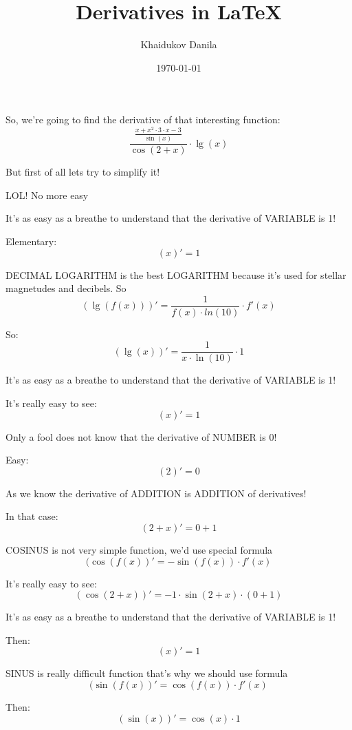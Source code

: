 \documentclass[a4paper,12pt]{article}
\author{Khaidukov Danila}
\title{Derivatives in \LaTeX{}}
\date{\today}
\begin{document}
\maketitle
\newpage

So, we're going to find the derivative of that interesting function:
\[ \frac{ \frac{ x + x ^ { 2 } \cdot 3 \cdot x - 3 }{ \sin\left( x\right)  } }{ \cos\left( 2 + x\right)  } \cdot \lg\left( x\right)  \]

But first of all lets try to simplify it!

LOL! No more easy

It's as easy as a breathe to understand that the derivative of VARIABLE is 1!

Elementary:
\[ \left(x\right)' = 1 \]

DECIMAL LOGARITHM is the best LOGARITHM because it's used for stellar magnetudes and decibels. So                                \[(\lg(f(x)))' = \frac{1}{f(x) \cdot ln(10)} \cdot f'(x) \]

So:
\[ \left(\lg\left( x\right) \right)' = \frac{ 1 }{ x \cdot \ln\left( 10\right)  } \cdot 1 \]

It's as easy as a breathe to understand that the derivative of VARIABLE is 1!

It's really easy to see:
\[ \left(x\right)' = 1 \]

Only a fool does not know that the derivative of NUMBER is 0!

Easy:
\[ \left(2\right)' = 0 \]

As we know the derivative of ADDITION is ADDITION of derivatives!

In that case:
\[ \left(2 + x\right)' = 0 + 1 \]

COSINUS is not very simple function, we'd use special formula                                \[(\cos(f(x))' = -\sin(f(x)) \cdot f'(x) \]

It's really easy to see:
\[ \left(\cos\left( 2 + x\right) \right)' = -1 \cdot \sin\left( 2 + x\right)  \cdot \left( 0 + 1\right)  \]

It's as easy as a breathe to understand that the derivative of VARIABLE is 1!

Then:
\[ \left(x\right)' = 1 \]

SINUS is really difficult function that's why we should use formula                                \[(\sin(f(x))' = \cos(f(x)) \cdot f'(x) \]

Then:
\[ \left(\sin\left( x\right) \right)' = \cos\left( x\right)  \cdot 1 \]
\end{document}
